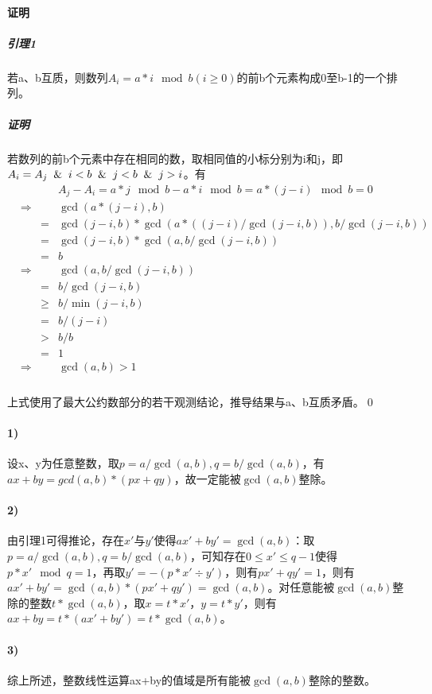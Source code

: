 \documentclass[UTF8]{ctexart}
\begin{document}
    \paragraph{证明}
    \subparagraph{引理1} 若a、b互质，则数列$A_i=a*i\mod b(i\geq0)$的前b个元素构成0至b-1的一个排列。
    \subparagraph{证明} 若数列的前b个元素中存在相同的数，取相同值的小标分别为i和j，即$A_i=A_j \And i<b \And j<b \And j>i$。有
    \begin{equation}
        \begin{aligned}
            &&&A_j-A_i=a*j\mod b-a*i\mod b=a*(j-i)\mod b=0\\
            &\Rightarrow &&\gcd(a*(j-i),b)\\
            &&=&\gcd(j-i,b)*\gcd(a*((j-i)/\gcd(j-i,b)),b/\gcd(j-i,b))\\
            &&=&\gcd(j-i,b)*\gcd(a,b/\gcd(j-i,b))\\
            &&=&b\\
            &\Rightarrow &&\gcd(a,b/\gcd(j-i,b))\\
            &&=&b/\gcd(j-i,b)\\
            &&\geq&b/\min(j-i,b)\\
            &&=&b/(j-i)\\
            &&>&b/b\\
            &&=&1\\
            &\Rightarrow &&\gcd(a,b)>1
        \end{aligned}
    \end{equation}
    \subparagraph{} 上式使用了最大公约数部分的若干观测结论，推导结果与a、b互质矛盾。\qed
    \paragraph{1)} 设x、y为任意整数，取$p=a/\gcd(a,b),q=b/\gcd(a,b)$，有$ax+by=gcd(a,b)*(px+qy)$，故一定能被$\gcd(a,b)$整除。
    \paragraph{2)} 由引理1可得推论，存在$x'$与$y'$使得$ax'+by'=\gcd(a,b)$：取$p=a/\gcd(a,b),q=b/\gcd(a,b)$，可知存在$0\leq x'\leq q-1$使得$p*x'\mod q=1$，再取$y'=-(p*x'\div y')$，则有$px'+qy'=1$，则有$ax'+by'=\gcd(a,b)*(px'+qy')=\gcd(a,b)$。对任意能被$\gcd(a,b)$整除的整数$t*\gcd(a,b)$，取$x=t*x'$，$y=t*y'$，则有$ax+by=t*(ax'+by')=t*\gcd(a,b)$。
    \paragraph{3)} 综上所述，整数线性运算ax+by的值域是所有能被$\gcd(a,b)$整除的整数。
\end{document}
